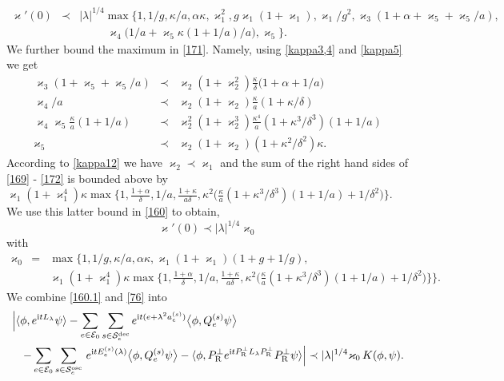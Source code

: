 \documentclass[letterpaper,onecolumn,11pt,accepted=2021-12-09]{quantumarticle}
\numberwithin{equation}{section}
\newcommand{\aes}{a_e^{(s)}}
\newcommand{\Qes}{Q_e^{(s)}}
\newcommand{\Ees}{E_e^{(s)}(\lambda)}
\renewcommand{\r}{{\rm R}}
\renewcommand{\i}{{\rm i}}
\begin{document}
\begin{eqnarray}
\label{160}
\varkappa'(0) &\prec& |\lambda|^{1/4} \max\Big\{1, 1/g,\kappa/a,\alpha\kappa,\varkappa^2_1,g\varkappa_1(1+\varkappa_1) , \varkappa_1/g^2, \varkappa_3(1+\alpha+\varkappa_5+\varkappa_5/a),\nonumber\\
&&\qquad \ \ \varkappa_4\big(1/a+\varkappa_5\kappa(1+1/a)/a\big), \varkappa_5\Big\}.
\label{171}
\end{eqnarray}
We further bound the maximum in \eqref{171}. Namely, using \eqref{kappa3,4} and \eqref{kappa5} we  get
\begin{eqnarray}
\varkappa_3(1+\varkappa_5+\varkappa_5/a) &\prec& \varkappa_2(1+\varkappa_2^2) \frac{\kappa}{\delta}\big(1+\alpha+1/a\big) \label{169}\\
\varkappa_4/a &\prec& \varkappa_2(1+\varkappa_2) \frac{\kappa}{a}(1+\kappa/\delta) \label{173}\\
\varkappa_4\varkappa_5\frac{\kappa}{a} (1+1/a) &\prec& \varkappa_2^2(1+\varkappa_2^3) \frac{\kappa^4}{a}(1+\kappa^3/\delta^3)(1+1/a) \label{174}\\
\varkappa_5 &\prec& \varkappa_2(1+\varkappa_2)(1+\kappa^2/\delta^2)\kappa.
\label{172}
\end{eqnarray}
According to \eqref{kappa12} we have $\varkappa_2\prec \varkappa_1$ and the sum of the right hand sides of \eqref{169} - \eqref{172} is  bounded above by $\varkappa_1(1+\varkappa_1^4)\kappa \max\big\{ 1,\tfrac{1+\alpha}{\delta}, 1/a, \tfrac{1+\kappa}{a\delta}, \kappa^2\big( \tfrac{\kappa}{a}(1+\kappa^3/\delta^3)(1+1/a)+1/\delta^2
\big)\big\}$. We use this latter bound in \eqref{160} to obtain,
\begin{equation}
\varkappa'(0) \prec |\lambda|^{1/4} \varkappa_0
\end{equation}
with
\begin{eqnarray}
\varkappa_0&=&
\max\Big\{1, 1/g,\kappa/a,\alpha\kappa,\varkappa_1(1+\varkappa_1)(1+g+1/g),\nonumber\\
&&\varkappa_1(1+\varkappa_1^4)\kappa \max\big\{ 1,\tfrac{1+\alpha}{\delta}, 1/a, \tfrac{1+\kappa}{a\delta}, \kappa^2\big( \tfrac{\kappa}{a}(1+\kappa^3/\delta^3)(1+1/a)+1/\delta^2
\big)\big\}\Big\}. \qquad
\label{160.1}
\end{eqnarray}
We combine \eqref{160.1} and  \eqref{76} into 
\begin{eqnarray}
\lefteqn{
	\Big| \langle\phi, e^{\i tL_\lambda}\psi\rangle  - \sum_{e\in{\mathcal E}_0}\sum_{s\in{\mathcal S}_e^{\rm dec}} e^{\i t (e+\lambda^2 \aes)} \big\langle\phi, \Qes\psi\big\rangle} \label{76.1}\\
&&-\sum_{e\in{\mathcal E}_0}\sum_{s\in{\mathcal S}_e^{\rm osc}}  \, e^{\i t \Ees}\big\langle \phi, \Qes\psi\big\rangle -\langle \phi, P^\perp_\r e^{\i t P^\perp_\r L_\lambda P^\perp_\r} P^\perp_\r \psi\rangle \Big| \prec|\lambda|^{1/4}\varkappa_0\, K(\phi,\psi).
\nonumber
\end{eqnarray}
\end{document}
